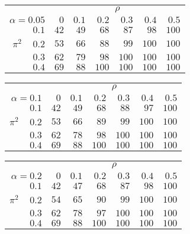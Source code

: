 \begin{tabular}{r|rrrrrr}
\hline\hline
 &\multicolumn{6}{c}{$\rho$} \\ 
 $\alpha = 0.05$ & $0$ & $0.1$ & $0.2$ & $0.3$ & $0.4$ & $0.5$ \\ 
 \hline$0.1$ & $ 42$ & $ 49$ & $ 68$ & $ 87$ & $ 98$ & $100$\\ 
$\pi^2\;\;\;$ $0.2$ & $ 53$ & $ 66$ & $ 88$ & $ 99$ & $100$ & $100$\\ 
$0.3$ & $ 62$ & $ 79$ & $ 98$ & $100$ & $100$ & $100$\\ 
$0.4$ & $ 69$ & $ 88$ & $100$ & $100$ & $100$ & $100$\\ 
 \hline 
 \end{tabular}
 
 \vspace{2em} 
 
\begin{tabular}{r|rrrrrr}
\hline\hline
 &\multicolumn{6}{c}{$\rho$} \\ 
 $\alpha = 0.1$ & $0$ & $0.1$ & $0.2$ & $0.3$ & $0.4$ & $0.5$ \\ 
 \hline$0.1$ & $ 42$ & $ 49$ & $ 68$ & $ 88$ & $ 97$ & $100$\\ 
$\pi^2\;\;\;$ $0.2$ & $ 53$ & $ 66$ & $ 89$ & $ 99$ & $100$ & $100$\\ 
$0.3$ & $ 62$ & $ 78$ & $ 98$ & $100$ & $100$ & $100$\\ 
$0.4$ & $ 69$ & $ 88$ & $100$ & $100$ & $100$ & $100$\\ 
 \hline 
 \end{tabular}
 
 \vspace{2em} 
 
\begin{tabular}{r|rrrrrr}
\hline\hline
 &\multicolumn{6}{c}{$\rho$} \\ 
 $\alpha = 0.2$ & $0$ & $0.1$ & $0.2$ & $0.3$ & $0.4$ & $0.5$ \\ 
 \hline$0.1$ & $ 42$ & $ 47$ & $ 68$ & $ 87$ & $ 98$ & $100$\\ 
$\pi^2\;\;\;$ $0.2$ & $ 54$ & $ 65$ & $ 90$ & $ 99$ & $100$ & $100$\\ 
$0.3$ & $ 62$ & $ 78$ & $ 97$ & $100$ & $100$ & $100$\\ 
$0.4$ & $ 69$ & $ 88$ & $100$ & $100$ & $100$ & $100$\\ 
 \hline 
 \end{tabular}